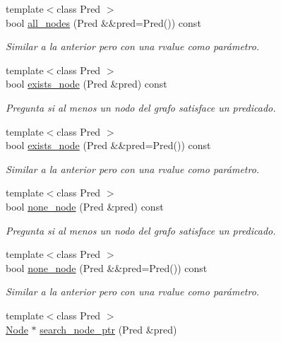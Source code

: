 \begin{DoxyCompactItemize}
{\footnotesize template$<$class Pred $>$ }\\bool \hyperlink{class_designar_1_1_base_graph_a32419ec17712a60c1964bc91e78d135c}{all\+\_\+nodes} (Pred \&\&pred=Pred()) const
\begin{DoxyCompactList}\small\item\em Similar a la anterior pero con una rvalue como parámetro. \end{DoxyCompactList}\item 
{\footnotesize template$<$class Pred $>$ }\\bool \hyperlink{class_designar_1_1_base_graph_a3631470de61b819211c72fdd2ac31b34}{exists\+\_\+node} (Pred \&pred) const
\begin{DoxyCompactList}\small\item\em Pregunta si al menos un nodo del grafo satisface un predicado. \end{DoxyCompactList}\item 
{\footnotesize template$<$class Pred $>$ }\\bool \hyperlink{class_designar_1_1_base_graph_a62df2c7ec71d2b009e96f8974968a3fc}{exists\+\_\+node} (Pred \&\&pred=Pred()) const
\begin{DoxyCompactList}\small\item\em Similar a la anterior pero con una rvalue como parámetro. \end{DoxyCompactList}\item 
{\footnotesize template$<$class Pred $>$ }\\bool \hyperlink{class_designar_1_1_base_graph_aa87c903e7fbf82a30edc9e442a115050}{none\+\_\+node} (Pred \&pred) const
\begin{DoxyCompactList}\small\item\em Pregunta si al menos un nodo del grafo satisface un predicado. \end{DoxyCompactList}\item 
{\footnotesize template$<$class Pred $>$ }\\bool \hyperlink{class_designar_1_1_base_graph_a394cdb81d0b0402e348dc87d2456d2d7}{none\+\_\+node} (Pred \&\&pred=Pred()) const
\begin{DoxyCompactList}\small\item\em Similar a la anterior pero con una rvalue como parámetro. \end{DoxyCompactList}\item 
{\footnotesize template$<$class Pred $>$ }\\\hyperlink{namespace_designar_a5af326c65aa2bd26b26c410f2030d09e}{Node} $\ast$ \hyperlink{class_designar_1_1_base_graph_aa15b13f58a4961b1593045d1e228adec}{search\+\_\+node\+\_\+ptr} (Pred \&pred)

\end{DoxyCompactItemize}
